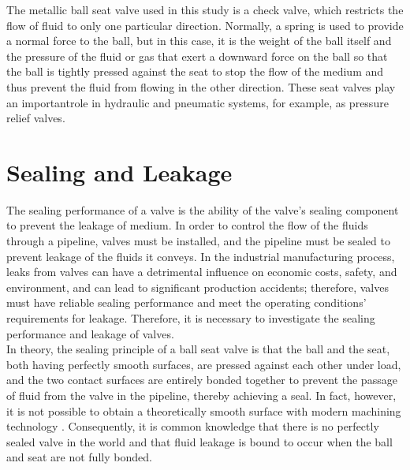 The metallic ball seat valve used in this study is a check valve, which restricts the 
flow of fluid to only one particular direction. Normally, a spring is used to provide 
a normal force to the ball, but in this case, it is the weight of the ball itself and
 the pressure of the fluid or gas that exert a downward force on the ball so that the 
 ball is tightly pressed against the seat to stop the flow of the medium and thus 
 prevent the fluid from flowing in the other direction. These seat valves play an 
 importantrole in hydraulic and pneumatic systems, for example, as pressure 
 relief valves.\\



\section{Sealing and Leakage}
\label{Sealing and Leakage}

The sealing performance of a valve is the ability of the valve's sealing component to prevent the leakage 
of medium. In order to control the flow of the fluids through a pipeline, valves must be installed, and 
the pipeline must be sealed to prevent leakage of the fluids it conveys. In the industrial manufacturing 
process, leaks from valves can have a detrimental influence on economic costs, safety, and environment, 
and can lead to significant production accidents; therefore, valves must have reliable sealing performance 
and meet the operating conditions' requirements 
for leakage. Therefore, it is necessary to investigate the sealing performance and leakage of valves.\\

In theory, the sealing principle of a ball seat valve is that the ball and the seat, both having 
perfectly smooth surfaces, are pressed against each other under load, and the two contact surfaces are 
entirely bonded together to prevent the passage of fluid from the valve in the pipeline, thereby achieving
a seal. In fact, however, it is not possible to obtain a theoretically smooth surface with 
modern machining technology \cite{Sealing1}. Consequently, it is common knowledge that there is no perfectly sealed valve in the world 
and that fluid leakage is bound to occur when the ball and seat are not fully bonded.\\

